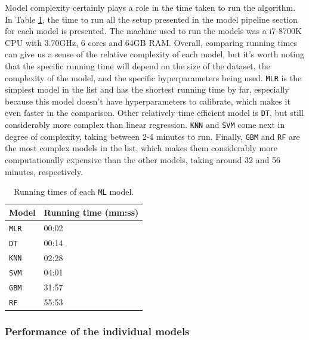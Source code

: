 \documentclass[12pt]{article}
\begin{document}
\par Model complexity certainly plays a role in the time taken to run the algorithm. In Table \ref{tab:runtime}, the time to run all the setup presented in the model pipeline section for each model is presented. The machine used to run the models was a i7-8700K CPU with 3.70GHz, 6 cores and 64GB RAM. Overall, comparing running times can give us a sense of the relative complexity of each model, but it's worth noting that the specific running time will depend on the size of the dataset, the complexity of the model, and the specific hyperparameters being used. \texttt{MLR} is the simplest model in the list and has the shortest running time by far, especially because this model doesn’t have hyperparameters to calibrate, which makes it even faster in the comparison. Other relatively time efficient model is \texttt{DT}, but still considerably more complex than linear regression. \texttt{KNN} and \texttt{SVM} come next in degree of complexity, taking between 2-4 minutes to run. Finally, \texttt{GBM} and \texttt{RF} are the most complex models in the list, which makes them considerably more computationally expensive than the other models, taking around 32 and 56 minutes, respectively.

\FloatBarrier
\begin{table}[h]
\centering
\tiny
{}
\begin{tabular}{p{4cm}p{4cm}}
\toprule
\textbf{Model} & \textbf{Running time (mm:ss)}\\
\midrule
\texttt{MLR} & 00:02 \\
\texttt{DT}  & 00:14 \\
\texttt{KNN} & 02:28 \\
\texttt{SVM} & 04:01 \\
\texttt{GBM} & 31:57 \\
\texttt{RF}  & 55:53 \\
\bottomrule
\end{tabular}
\caption{Running times of each \texttt{ML} model.}
\label{tab:runtime}
\end{table}

\subsubsection{Performance of the individual models} \label{sec:datagen:proceval:perform}
\end{document}

